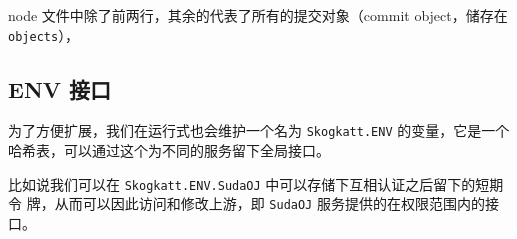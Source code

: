 node 文件中除了前两行，其余的代表了所有的提交对象（commit object，储存在 %
\verb|objects|），

\subsection{ENV 接口} \label{fbs::jiekou}
为了方便扩展，我们在运行式也会维护一个名为 \verb|Skogkatt.ENV| 的变量，它是一个
哈希表，可以通过这个为不同的服务留下全局接口。

比如说我们可以在 \verb|Skogkatt.ENV.SudaOJ| 中可以存储下互相认证之后留下的短期令
牌，从而可以因此访问和修改上游，即 \verb|SudaOJ| 服务提供的在权限范围内的接口。

